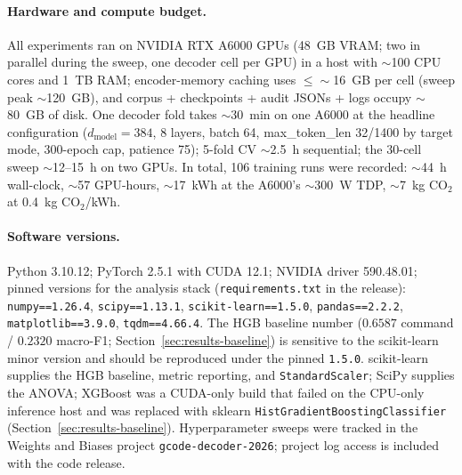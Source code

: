 \documentclass[sensors,article,submit,moreauthors,pdftex]{Definitions/mdpi}
\begin{document}
\paragraph{Hardware and compute budget.}
\label{app3:repro-hardware}
All experiments ran on NVIDIA RTX A6000 GPUs (48~GB VRAM; two in parallel during the sweep, one decoder cell per GPU) in a host with $\sim$100 CPU cores and 1~TB RAM; encoder-memory caching uses $\le\!\sim$16~GB per cell (sweep peak $\sim$120~GB), and corpus + checkpoints + audit JSONs + logs occupy $\sim$80~GB of disk. One decoder fold takes $\sim$30~min on one A6000 at the headline configuration ($d_{\text{model}}=384$, 8 layers, batch 64, max\_token\_len 32/1400 by target mode, 300-epoch cap, patience 75); 5-fold CV $\sim$2.5~h sequential; the 30-cell sweep $\sim$12--15~h on two GPUs. In total, 106 training runs were recorded: $\sim$44~h wall-clock, $\sim$57 GPU-hours, $\sim$17~kWh at the A6000's $\sim$300~W TDP, $\sim$7~kg CO$_2$ at 0.4~kg CO$_2$/kWh.

\paragraph{Software versions.}
\label{app3:repro-software}
Python 3.10.12; PyTorch 2.5.1 with CUDA 12.1; NVIDIA driver 590.48.01; pinned versions for the analysis stack
(\texttt{requirements.txt} in the release): \texttt{numpy==1.26.4}, \texttt{scipy==1.13.1},
\texttt{scikit-learn==1.5.0}, \texttt{pandas==2.2.2}, \texttt{matplotlib==3.9.0}, \texttt{tqdm==4.66.4}. The
HGB baseline number ($0.6587$ command / $0.2320$ macro-F1; Section~\ref{sec:results-baseline}) is sensitive to
the scikit-learn minor version and should be reproduced under the pinned \texttt{1.5.0}. scikit-learn supplies
the HGB baseline, metric reporting, and \texttt{StandardScaler}; SciPy supplies the ANOVA; XGBoost was a
CUDA-only build that failed on the CPU-only inference host and was replaced with sklearn
\texttt{HistGradientBoostingClassifier} (Section~\ref{sec:results-baseline}). Hyperparameter sweeps were
tracked in the Weights and Biases project \texttt{gcode-decoder-2026}; project log access is included with the
code release.
\end{document}
